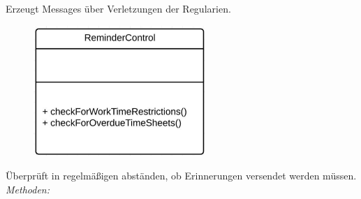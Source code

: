 \begin{itemize}
\begin{itemize}
\begin{itemize}
                            Erzeugt Messages über Verletzungen der Regularien.
                       \end{itemize}

                    \newpage
                    \begin{figure}[htb]
                    \centering
                    \includegraphics[width=6.5cm]{Diagramms/class/singleclass/ControlRem.pdf}
                    \end{figure}
                    \newline
                        Überprüft in regelmäßigen abständen, ob Erinnerungen versendet werden müssen.
                        \newline
                        \emph{Methoden:}
                        \begin{itemize}
                        \end{itemize}


\end{itemize}
\end{itemize}
